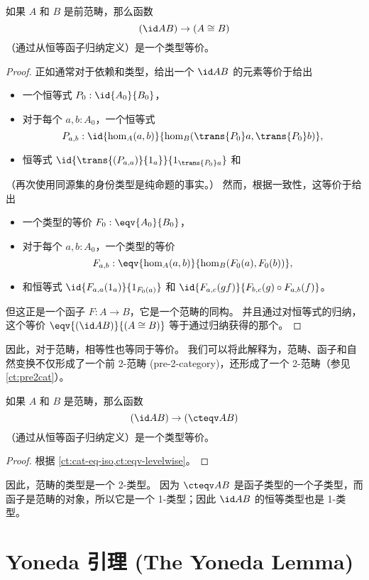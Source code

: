 \begin{lem}\label{ct:cat-eq-iso}
如果 $A$ 和 $B$ 是前范畴，那么函数
\[(\id A B) \to (A\cong B)\]
（通过从恒等函子归纳定义）是一个类型等价。
\end{lem}
\begin{proof}
  正如通常对于依赖和类型，给出一个 $\id A B$ 的元素等价于给出
  \begin{itemize}
    \item 一个恒等式 $P_0:\id{A_0}{B_0}$，
    \item 对于每个 $a,b:A_0$，一个恒等式
    \[P_{a,b}:\id{\hom_A(a,b)}{\hom_B(\trans {P_0} a,\trans {P_0} b)},\]
    \item 恒等式 $\id{\trans {(P_{a,a})} {1_a}}{1_{\trans {P_0} a}}$ 和
  \end{itemize}
  （再次使用同源集的身份类型是纯命题的事实。）
  然而，根据一致性，这等价于给出
  \begin{itemize}
    \item 一个类型的等价 $F_0:\eqv{A_0}{B_0}$，
    \item 对于每个 $a,b:A_0$，一个类型的等价
    \[F_{a,b}:\eqv{\hom_A(a,b)}{\hom_B(F_0 (a),F_0 (b))},\]
    \item 和恒等式 $\id{F_{a,a}(1_a)}{1_{F_0 (a)}}$ 和 $\id{F_{a,c}(gf)}{F_{b,c} (g)\circ F_{a,b} (f)}$。
  \end{itemize}
  但这正是一个函子 $F:A\to B$，它是一个范畴的同构。
  并且通过对恒等式的归纳，这个等价 $\eqv{(\id A B)}{(A\cong B)}$ 等于通过归纳获得的那个。
\end{proof}

因此，对于范畴，相等性也等同于等价。
我们可以将此解释为，范畴、函子和自然变换不仅形成了一个前 2-范畴 (pre-2-category)，还形成了一个 2-范畴（参见 \cref{ct:pre2cat}）。

\begin{thm}\label{ct:cat-2cat}
如果 $A$ 和 $B$ 是范畴，那么函数
\[(\id A B) \to (\cteqv A B)\]
（通过从恒等函子归纳定义）是一个类型等价。
\end{thm}
\begin{proof}
  根据 \cref{ct:cat-eq-iso,ct:eqv-levelwise}。
\end{proof}

因此，范畴的类型是一个 2-类型。
因为 $\cteqv A B$ 是函子类型的一个子类型，而函子是范畴的对象，所以它是一个 1-类型；因此 $\id A B$ 的恒等类型也是 1-类型。

\section{Yoneda 引理 (The Yoneda Lemma)}
\label{sec:yoneda}

